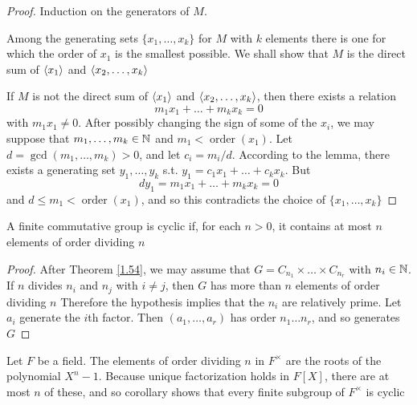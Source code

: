 \documentclass[11pt]{article}
\DeclareMathOperator{\order}{order}
\begin{document}
\begin{proof}
Induction on the generators of \(M\).

Among the generating sets \(\{x_1,\dots,x_k\}\) for \(M\) with \(k\) elements there is one for which
the order of \(x_1\) is the smallest possible. We shall show that \(M\) is the direct sum
of \(\langle x_1\rangle\) and \(\langle x_2,\dots,x_k\rangle\)

If \(M\) is not the direct sum of \(\langle x_1\rangle\) and \(\langle x_2,\dots,x_k\rangle\), then there exists a relation
\begin{equation*}
m_1x_1+\dots+m_kx_k=0
\end{equation*}
with \(m_1x_1\neq 0\). After possibly changing the sign of some of the \(x_i\), we may suppose
that \(m_1,\dots,m_k\in\mathbb{N}\) and \(m_1<\order(x_1)\). Let \(d=\gcd(m_1,\dots,m_k)>0\), and let \(c_i=m_i/d\).
According to the lemma, there exists a generating set \(y_1,\dots,y_k\) s.t. \(y_1=c_1x_1+\dots+c_kx_k\).
But
\begin{equation*}
dy_1=m_1x_1+\dots+m_kx_k=0
\end{equation*}
and \(d\le m_1<\order(x_1)\), and so this contradicts the choice of \(\{x_1,\dots,x_k\}\)
\end{proof}

\begin{corollary}[]
A finite commutative group is cyclic if, for each \(n>0\), it contains at most \(n\) elements of
order dividing \(n\)
\end{corollary}

\begin{proof}
After Theorem \ref{1.54}, we may assume that \(G=C_{n_1}\times\dots\times C_{n_r}\) with \(n_i\in\mathbb{N}\). If \(n\)
divides \(n_i\) and \(n_j\) with \(i\neq j\), then \(G\) has more than \(n\) elements of order
dividing \(n\)
Therefore the hypothesis implies that the \(n_i\) are relatively prime.
Let \(a_i\) generate the \(i\)th factor. Then \((a_1,\dots,a_r)\) has order \(n_1\dots n_r\), and so
generates \(G\)
\end{proof}

\begin{examplle}[]
\label{1.56}
Let \(F\) be a field. The elements of order dividing \(n\) in \(F^{\times}\) are the roots of the
polynomial \(X^n-1\). Because unique factorization holds in \(F[X]\), there are at most \(n\) of
these, and so corollary shows that every finite subgroup of \(F^{\times}\) is cyclic
\end{examplle}
\end{document}
